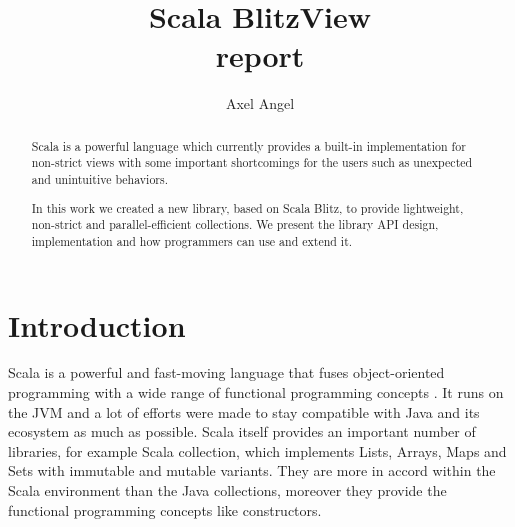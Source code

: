\documentclass[a4paper,12pt,twocolumn]{article}
\title{Scala BlitzView\\report}
\author{Axel Angel}
\begin{document}
\maketitle

\begin{abstract}
Scala is a powerful language which currently provides a built-in implementation for non-strict views with some important shortcomings for the users such as unexpected and unintuitive behaviors.

In this work we created a new library, based on Scala Blitz, to provide lightweight, non-strict and parallel-efficient collections.
We present the library API design, implementation and how programmers can use and extend it.
\end{abstract}

\section{Introduction}
Scala is a powerful and fast-moving language that fuses object-oriented programming with a wide range of functional programming concepts \cite{scala-overview}.
It runs on the JVM and a lot of efforts were made to stay compatible with Java and its ecosystem as much as possible.
Scala itself provides an important number of libraries, for example Scala collection, which implements Lists, Arrays, Maps and Sets with immutable and mutable variants.
They are more in accord within the Scala environment than the Java collections, moreover they provide the functional programming concepts like constructors.
\end{document}

